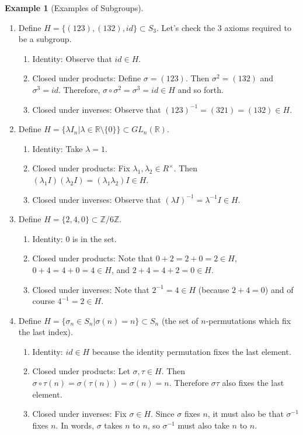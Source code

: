 \documentclass[12pt]{article}
\theoremstyle{definition}
\newtheorem{example}{\color{WildStrawberry}Example}
\theoremstyle{definition}
\begin{document}
\begin{example}[Examples of Subgroups]
\begin{enumerate}
	\item Define $H = \{ (1 2 3), (1 3 2), id \} \subset S_3$. Let's check the 3 axioms required to be a subgroup.
	\begin{enumerate}
		\item Identity: Observe that $id \in H$.
		\item Closed under products: Define $\sigma = (1 2 3)$. Then $\sigma^2 = (1 3 2)$ and $\sigma^3 = id$. Therefore, $\sigma \circ \sigma^2 = \sigma^3 = id \in H$ and so forth. 
		\item Closed under inverses: Observe that $(1 2 3)^{-1} = (3 2 1) = (1 3 2) \in H$. 
	\end{enumerate}
	\item Define $H = \{ \lambda I_n \vert \lambda \in \mathbb{R} \setminus \{0\} \} \subset GL_n(\mathbb{R})$.
	\begin{enumerate}
		\item Identity: Take $\lambda = 1$.
		\item Closed under products: Fix $\lambda_1, \lambda_2 \in R^{\times}$. Then $(\lambda_1 I)(\lambda_2 I) = (\lambda_1 \lambda_2) I \in H$.
		\item Closed under inverses: Observe that $(\lambda I)^{-1} = \lambda^{-1} I \in H$.
	\end{enumerate}
	\item Define $H = \{2, 4, 0 \} \subset \mathbb{Z} / 6 \mathbb{Z}$.
	\begin{enumerate}
		\item Identity: $0$ is in the set.
		\item Closed under products: Note that $0 + 2 = 2 + 0 = 2 \in H$, $0 + 4 = 4 + 0 = 4 \in H$, and $2 + 4 = 4 + 2 = 0 \in H$.
		\item Closed under inverses: Note that $2^{-1} = 4 \in H$ (because $2 + 4 = 0$) and of course $4^{-1} = 2 \in H$.
	\end{enumerate}
	\item Define $H = \{ \sigma_n \in S_n | \sigma(n) = n \} \subset S_n$ (the set of $n$-permutations which fix the last index).
	\begin{enumerate}
		\item Identity: $id \in H$ because the identity permutation fixes the last element.
		\item Closed under products: Let $\sigma, \tau \in H$. Then $\sigma \circ \tau (n) = \sigma(\tau(n)) = \sigma(n) = n$. Therefore $\sigma \tau$ also fixes the last element.
		\item Closed under inverses: Fix $\sigma \in H$. Since $\sigma$ fixes $n$, it must also be that $\sigma^{-1}$ fixes $n$. In words, $\sigma$ takes $n$ to $n$, so $\sigma^{-1}$ must also take $n$ to $n$.
	\end{enumerate}
\end{enumerate}
\end{example}
\end{document}

